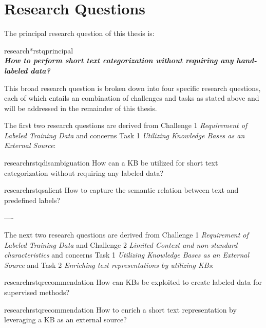 \section{Research Questions} \label{sec:questions}

The principal research question of this thesis is:
\begin{restatable}{research*}{rstqprincipal} \label{q:qprincipal}
\vspace{1em}~\\
\forceindent \textbf{\emph{How to perform short text categorization without requiring any hand-labeled data?}}
\vspace{1em}
\end{restatable}

This broad research question is broken down into four specific research questions, each of which entails an combination of challenges and tasks as stated above and will be addressed in the remainder of this thesis.

\noindent The first two research questions are derived from Challenge 1 \emph{Requirement of Labeled Training Data} and concerns Task 1 \emph{Utilizing Knowledge Bases as an External Source}:

\begin{restatable}{research}{rstqdisambiguation} \label{q:disambiguation}
How can a KB be utilized for short text categorization without requiring any labeled data?
\end{restatable}
\vspace{-0.9em}
\begin{restatable}{research}{rstqsalient} \label{q:salient}
How to capture the semantic relation between text and predefined labels?
\end{restatable}
\vspace{-0.9em}
----


The next two research questions are derived from Challenge 1 \emph{Requirement of Labeled Training Data} and Challenge 2 \emph{Limited Context and non-standard characteristics} and concerns Task 1 \emph{Utilizing Knowledge Bases as an External Source} and Task 2 \emph{Enriching text representations by utilizing KBs}:

\begin{restatable}{research}{rstqrecommendation} \label{q:recommendation}
How can KBs be exploited to create labeled data for supervised methods?
\end{restatable}
\vspace{-0.9em}
\begin{restatable}{research}{rstqrecommendation} \label{q:recommendation}
How to enrich a short text representation by leveraging a KB as an external source?
\end{restatable}
\vspace{-0.9em}


